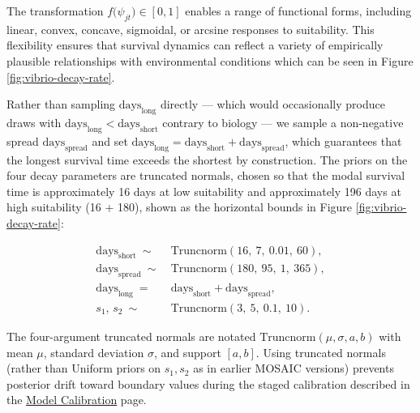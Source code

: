 \documentclass[
]{book}
\begin{document}
The transformation \(f\big(\psi_{jt}\big) \in [0, 1]\) enables a range of functional forms, including linear, convex, concave, sigmoidal, or arcsine responses to suitability. This flexibility ensures that survival dynamics can reflect a variety of empirically plausible relationships with environmental conditions which can be seen in Figure \ref{fig:vibrio-decay-rate}.

Rather than sampling \(\text{days}_{\text{long}}\) directly --- which would occasionally produce draws with \(\text{days}_{\text{long}} < \text{days}_{\text{short}}\) contrary to biology --- we sample a non-negative spread \(\text{days}_{\text{spread}}\) and set \(\text{days}_{\text{long}} = \text{days}_{\text{short}} + \text{days}_{\text{spread}}\), which guarantees that the longest survival time exceeds the shortest by construction. The priors on the four decay parameters are truncated normals, chosen so that the modal survival time is approximately 16 days at low suitability and approximately 196 days at high suitability (16 + 180), shown as the horizontal bounds in Figure \ref{fig:vibrio-decay-rate}:

\[
\begin{aligned}
\text{days}_{\text{short}} \ \sim\ & \text{Truncnorm}(16,\ 7,\ 0.01,\ 60),\\
\text{days}_{\text{spread}} \ \sim\ & \text{Truncnorm}(180,\ 95,\ 1,\ 365),\\
\text{days}_{\text{long}} \ =\ & \text{days}_{\text{short}} + \text{days}_{\text{spread}},\\
s_1,\, s_2 \ \sim\ & \text{Truncnorm}(3,\ 5,\ 0.1,\ 10).
\end{aligned}
\label{eq:decay-priors}
\]

The four-argument truncated normals are notated \(\text{Truncnorm}(\mu, \sigma, a, b)\) with mean \(\mu\), standard deviation \(\sigma\), and support \([a, b]\). Using truncated normals (rather than Uniform priors on \(s_1, s_2\) as in earlier MOSAIC versions) prevents posterior drift toward boundary values during the staged calibration described in the \href{https://www.mosaicmod.org/model-calibration-1.html}{Model Calibration} page.
\end{document}
